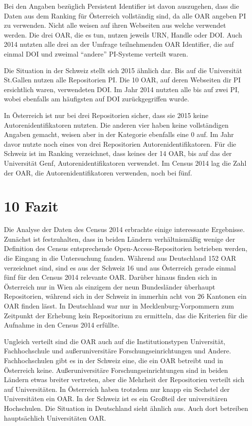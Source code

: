 \documentclass[a4paper,
fontsize=11pt,
oneside,
numbers=noperiodatend,
parskip=half-,
bibliography=totoc,
final
]{scrartcl}
\begin{document}
Bei den Angaben bezüglich Persistent Identifier ist davon auszugehen,
dass die Daten aus dem Ranking für Österreich vollständig sind, da alle
OAR angeben PI zu verwenden. Nicht alle weisen auf ihren Webseiten aus
welche verwendet werden. Die drei OAR, die es tun, nutzen jeweils URN,
Handle oder DOI. Auch 2014 nutzten alle drei an der Umfrage
teilnehmenden OAR Identifier, die auf einmal DOI und zweimal
\enquote{andere} PI-Systeme verteilt waren.

Die Situation in der Schweiz stellt sich 2015 ähnlich dar. Bis auf die
Universität St.Gallen nutzen alle Repositorien PI. Die 10 OAR, auf deren
Webseiten dir PI ersichtlich waren, verwendeten DOI. Im Jahr 2014
nutzten alle bis auf zwei PI, wobei ebenfalls am häufigsten auf DOI
zurückgegriffen wurde.

In Österreich ist nur bei drei Repositorien sicher, dass sie 2015 keine
Autorenidentifikatoren nutzten. Die anderen vier haben keine
vollständigen Angaben gemacht, weisen aber in der Kategorie ebenfalls
eine 0 auf. Im Jahr davor nutzte noch eines von drei Repositorien
Autorenidentifikatoren. Für die Schweiz ist im Ranking verzeichnet, dass
keines der 14 OAR, bis auf das der Universität Genf,
Autorenidentifikatoren verwendet. Im Census 2014 lag die Zahl der OAR,
die Autorenidentifikatoren verwenden, noch bei fünf.

\section*{10 Fazit}\label{fazit}

Die Analyse der Daten des Census 2014 erbrachte einige interessante
Ergebnisse. Zunächst ist festzuhalten, dass in beiden Ländern
verhältnismäßig wenige der Definition des Census entsprechende
Open-Access-Repositorien betrieben werden, die Eingang in die
Untersuchung fanden. Während aus Deutschland 152 OAR verzeichnet sind,
sind es aus der Schweiz 16 und aus Österreich gerade einmal fünf für den
Census 2014 relevante OAR. Darüber hinaus finden sich in Österreich nur
in Wien als einzigem der neun Bundesländer überhaupt Repositorien,
während sich in der Schweiz in immerhin acht von 26 Kantonen ein OAR
finden lässt. In Deutschland war nur in Mecklenburg-Vorpommern zum
Zeitpunkt der Erhebung kein Repositorium zu ermitteln, das die Kriterien
für die Aufnahme in den Census 2014 erfüllte.

Ungleich verteilt sind die OAR auch auf die Institutionstypen
Universität, Fachhochschule und außeruniversitäre
Forschungseinrichtungen und Andere. Fachhochschulen gibt es in der
Schweiz eine, die ein OAR betreibt und in Österreich keine.
Außeruniversitäre Forschungseinrichtungen sind in beiden Ländern etwas
breiter vertreten, aber die Mehrheit der Repositorien verteilt sich auf
Universitäten. In Österreich haben trotzdem nur knapp ein Sechstel der
Universitäten ein OAR. In der Schweiz ist es ein Großteil der
universitären Hochschulen. Die Situation in Deutschland sieht ähnlich
aus. Auch dort betreiben hauptsächlich Universitäten OAR.
\end{document}

